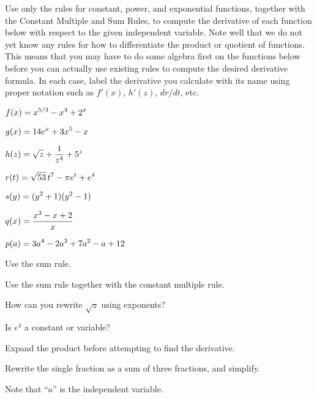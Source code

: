 \begin{activity} \label{A:2.1.2}  Use only the rules for constant, power, and exponential functions, together with the Constant Multiple and Sum Rules,  to compute the derivative of each function below with respect to the given independent variable.  Note well that we do not yet know any rules for how to differentiate the product or quotient of functions.  This means that you may have to do some algebra first on the functions below before you can actually use existing rules to compute the desired derivative formula.  In each case, label the derivative you calculate with its name using proper notation such as $f'(x)$, $h'(z)$, $dr/dt$, etc.

\setlength{\columnsep}{5pt}
\bmtwo
\ba
	  \item $\displaystyle f(x) = x^{5/3} - x^4 + 2^x$
	  \item $\displaystyle g(x) = 14e^x + 3x^5 - x$
	  \item $\displaystyle h(z) = \sqrt{z} + \frac{1}{z^4} + 5^z$
	  \item $\displaystyle r(t) = \sqrt{53} \, t^7 - \pi e^t + e^4$
	  \item $\displaystyle s(y) = (y^2 + 1)(y^2 - 1)$
	  \item $\displaystyle q(x) = \displaystyle \frac{x^3 - x + 2}{x}$
	  \item $\displaystyle p(a) = 3a^4 - 2a^3 + 7a^2 - a + 12$
\ea
\emtwo

\end{activity}
\begin{smallhint}
\ba
	  \item Use the sum rule.
	  \item Use the sum rule together with the constant multiple rule.
	  \item How can you rewrite $\sqrt{z}$ using exponents?
	  \item Is $e^4$ a constant or variable?
	  \item Expand the product before attempting to find the derivative.
	  \item Rewrite the single fraction as a sum of three fractions, and simplify.
	  \item Note that ``$a$'' is the independent variable.
\ea
\end{smallhint}
